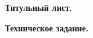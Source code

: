 \documentclass[utf8x, 12pt]{G7-32} %
\begin{document}
\frontmatter %



% 

\textbf{Титульный лист.}
\newpage

\textbf{Техническое задание.}
\newpage

\tableofcontents

% 
% 



\mainmatter %





\backmatter %






% 
% 
% 
% 
\end{document}
